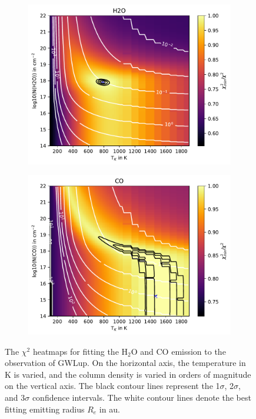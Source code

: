 \documentclass[oneside, single, authoryear, semicolon, 12pt]{lion-msc}
\newcommand{\4}{$_4$}
\newcommand{\3}{$_3$}
\newcommand{\2}{$_2$}
\begin{document}
\begin{figure}[!ht]
    \centering
    \begin{subfigure}[b]{0.49\textwidth}
        \centering
        \includegraphics[width=\textwidth]{radexpy_niels/Radexpy_for_Niels/chi2_map_H2O_Sz98.pdf}
    \end{subfigure}
    \hfill
    \begin{subfigure}[b]{0.49\textwidth}
        \centering
        \includegraphics[width=\textwidth]{radexpy_niels/Radexpy_for_Niels/chi2_map_CO_Sz98.pdf}
    \end{subfigure}
    \caption{The $\chi^2$ heatmaps for fitting the H\2O and CO emission to the observation of GWLup. On the horizontal axis, the temperature in K is varied, and the column density is varied in orders of magnitude on the vertical axis. The black contour lines represent the 1$\sigma$, 2$\sigma$, and 3$\sigma$ confidence intervals. The white contour lines denote the best fitting emitting radius $R_e$ in au.}
\end{figure}
\end{document}
